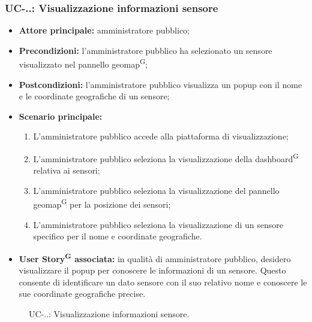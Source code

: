 \documentclass[8pt]{article}
\newcommand{\glossterm}[1]{#1\textsuperscript{G}} %
\begin{document}
\subsubsection*{UC-\theuc .\thespecone .\spectwonumber: Visualizzazione informazioni sensore}
\begin{itemize}
    \item \textbf{Attore principale:} amministratore pubblico;
    \item \textbf{Precondizioni:} l'amministratore pubblico ha selezionato un sensore visualizzato nel pannello \glossterm{geomap};
    \item \textbf{Postcondizioni:} l'amministratore pubblico visualizza un popup con il nome e le coordinate geografiche di un sensore;
    \item \textbf{Scenario principale:}
    \begin{enumerate}
        \item L'amministratore pubblico accede alla piattaforma di visualizzazione;
        \item L'amministratore pubblico seleziona la visualizzazione della \glossterm{dashboard} relativa ai sensori;
        \item L'amministratore pubblico seleziona la visualizzazione del pannello \glossterm{geomap} per la posizione dei sensori;
        \item L'amministratore pubblico seleziona la visualizzazione di un sensore specifico per il nome e coordinate geografiche.
    \end{enumerate}
    \item \textbf{\glossterm{User Story} associata:} in qualità di amministratore pubblico, desidero visualizzare il popup per conoscere le informazioni di un sensore. Questo consente di identificare un dato sensore con il suo relativo nome e conoscere le sue coordinate geografiche precise.
\end{itemize}
\begin{figure}[ht!]
    \centering
    \caption{UC-\theuc .\thespecone .\thespectwo: Visualizzazione informazioni sensore.}
    \label{fig:UC-\theuc .\thespecone .\thespectwo: Visualizzazione informazioni sensore}
\end{figure}
\end{document}
